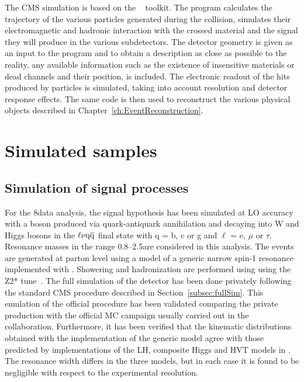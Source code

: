The CMS simulation is based on the \GEANTfour~\cite{Agostinelli:2002hh} toolkit.
The program calculates the trajectory of the various particles generated during the collision, simulates their electromagnetic and hadronic interaction with the crossed material and the signal they will produce in the various subdetectors.
The detector geometry is given as an input to the program and to obtain a description as close as possible to the reality, any available information such as the existence of insensitive materials or dead channels and their position, is included.
The electronic readout of the hits produced by particles is simulated, taking into account resolution and detector response effects.
The same code is then used to reconstruct the various physical objects described in Chapter~\ref{ch:EventReconstruction}.

\section{Simulated samples}\label{sec:MCsamples}

\subsection{Simulation of signal processes}\label{subsec:signalMC}

For the 8\TeV data analysis, the signal hypothesis has been simulated at LO accuracy with a \Wpr boson produced via quark-antiquark annihilation and decaying into W and Higgs bosons
in the $\ell\nu\mathrm{q}\overline{\mathrm{q}}$ final state with q = b, c or g and $\ell$ = e, $\mu$ or $\tau$. Resonance masses in the range 0.8--2.5\TeV are considered in this analysis.
The events are generated at parton level using a model of a generic narrow spin-1 \Wpr resonance implemented with \MADGRAPH{}.
Showering and hadronization are performed using  using the Z2* tune~\cite{Chatrchyan:2011id,Chatrchyan:2013gfi}.
The full simulation of the detector has been done privately following the standard CMS procedure described in Section~\ref{subsec:fullSim}.
This emulation of the official procedure has been validated comparing the private production with the official MC campaign usually carried out in the collaboration.
Furthermore, it has been verified that the kinematic distributions obtained with the implementation of the generic model 
agree with those predicted by implementations of the LH, composite Higgs and HVT models in \MADGRAPH{}.
The resonance width differs in the three models, but in each case it is found to be negligible with respect to the experimental resolution.

